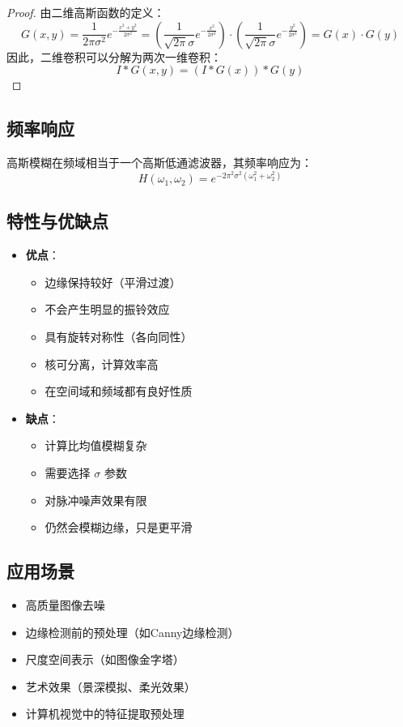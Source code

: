 \documentclass{article}
\begin{document}
\begin{proof}
由二维高斯函数的定义：
\[
G(x,y) = \frac{1}{2\pi\sigma^2} e^{-\frac{x^2+y^2}{2\sigma^2}} = \left(\frac{1}{\sqrt{2\pi}\sigma} e^{-\frac{x^2}{2\sigma^2}}\right) \cdot \left(\frac{1}{\sqrt{2\pi}\sigma} e^{-\frac{y^2}{2\sigma^2}}\right) = G(x) \cdot G(y)
\]
因此，二维卷积可以分解为两次一维卷积：
\[
I * G(x,y) = (I * G(x)) * G(y)
\]
\end{proof}

\subsection{频率响应}
高斯模糊在频域相当于一个高斯低通滤波器，其频率响应为：
\[
H(\omega_1, \omega_2) = e^{-2\pi^2\sigma^2(\omega_1^2 + \omega_2^2)}
\]

\subsection{特性与优缺点}

\begin{itemize}
    \item \textbf{优点}：
    \begin{itemize}
        \item 边缘保持较好（平滑过渡）
        \item 不会产生明显的振铃效应
        \item 具有旋转对称性（各向同性）
        \item 核可分离，计算效率高
        \item 在空间域和频域都有良好性质
    \end{itemize}

    \item \textbf{缺点}：
    \begin{itemize}
        \item 计算比均值模糊复杂
        \item 需要选择 $\sigma$ 参数
        \item 对脉冲噪声效果有限
        \item 仍然会模糊边缘，只是更平滑
    \end{itemize}
\end{itemize}

\subsection{应用场景}
\begin{itemize}
    \item 高质量图像去噪
    \item 边缘检测前的预处理（如Canny边缘检测）
    \item 尺度空间表示（如图像金字塔）
    \item 艺术效果（景深模拟、柔光效果）
    \item 计算机视觉中的特征提取预处理
\end{itemize}
\end{document}

